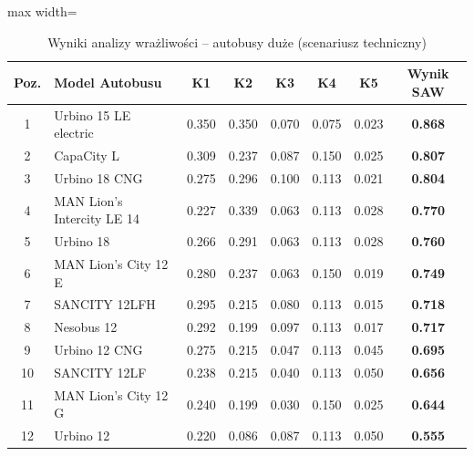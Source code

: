 \begin{table}[H]
    \centering
    \caption{Wyniki analizy wrażliwości -- autobusy duże (scenariusz techniczny)}
    \vspace{0.2cm}
    \begin{adjustbox}{max width=\textwidth}
    \begin{tabular}{|c|l|c|c|c|c|c|c|}
        \hline
        \textbf{Poz.} & \textbf{Model Autobusu} & \textbf{K1} & \textbf{K2} & \textbf{K3} & \textbf{K4} & \textbf{K5} & \textbf{Wynik SAW} \\ \hline
        1 & Urbino 15 LE electric      & 0.350 & 0.350 & 0.070 & 0.075 & 0.023 & \textbf{0.868} \\ \hline
        2 & CapaCity L                 & 0.309 & 0.237 & 0.087 & 0.150 & 0.025 & \textbf{0.807} \\ \hline
        3 & Urbino 18 CNG              & 0.275 & 0.296 & 0.100 & 0.113 & 0.021 & \textbf{0.804} \\ \hline
        4 & MAN Lion's Intercity LE 14 & 0.227 & 0.339 & 0.063 & 0.113 & 0.028 & \textbf{0.770} \\ \hline
        5 & Urbino 18                  & 0.266 & 0.291 & 0.063 & 0.113 & 0.028 & \textbf{0.760} \\ \hline
        6 & MAN Lion's City 12 E       & 0.280 & 0.237 & 0.063 & 0.150 & 0.019 & \textbf{0.749} \\ \hline
        7 & SANCITY 12LFH              & 0.295 & 0.215 & 0.080 & 0.113 & 0.015 & \textbf{0.718} \\ \hline
        8 & Nesobus 12                 & 0.292 & 0.199 & 0.097 & 0.113 & 0.017 & \textbf{0.717} \\ \hline
        9 & Urbino 12 CNG              & 0.275 & 0.215 & 0.047 & 0.113 & 0.045 & \textbf{0.695} \\ \hline
        10 & SANCITY 12LF              & 0.238 & 0.215 & 0.040 & 0.113 & 0.050 & \textbf{0.656} \\ \hline
        11 & MAN Lion's City 12 G      & 0.240 & 0.199 & 0.030 & 0.150 & 0.025 & \textbf{0.644} \\ \hline
        12 & Urbino 12                 & 0.220 & 0.086 & 0.087 & 0.113 & 0.050 & \textbf{0.555} \\ \hline
    \end{tabular}
    \end{adjustbox}
\end{table}


